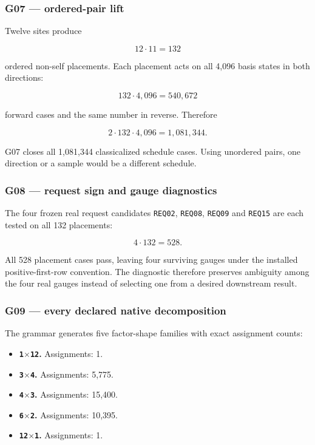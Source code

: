 \subsubsection{G07 --- ordered-pair lift}\label{viii-ch02-g07-ordered-pair-lift}

Twelve sites produce

\[
12\cdot11=132
\]

ordered non-self placements. Each placement acts on all 4,096 basis
states in both directions:

\[
132\cdot4{,}096=540{,}672
\]

forward cases and the same number in reverse. Therefore

\[
2\cdot132\cdot4{,}096=1{,}081{,}344.
\]

G07 closes all 1,081,344 classicalized schedule cases. Using unordered
pairs, one direction or a sample would be a different schedule.

\subsubsection{G08 --- request sign and gauge
diagnostics}\label{viii-ch02-g08-request-sign-and-gauge-diagnostics}

The four frozen real request candidates \texttt{REQ02}, \texttt{REQ08},
\texttt{REQ09} and \texttt{REQ15} are each tested on all 132 placements:

\[
4\cdot132=528.
\]

All 528 placement cases pass, leaving four surviving gauges under the
installed positive-first-row convention. The diagnostic therefore
preserves ambiguity among the four real gauges instead of selecting one
from a desired downstream result.

\subsubsection{G09 --- every declared native
decomposition}\label{viii-ch02-g09-every-declared-native-decomposition}

The grammar generates five factor-shape families with exact assignment
counts:

\begin{itemize}
\tightlist
\item
  \textbf{\texttt{1\ensuremath{\times}12}.} Assignments: 1.
\item
  \textbf{\texttt{3\ensuremath{\times}4}.} Assignments: 5,775.
\item
  \textbf{\texttt{4\ensuremath{\times}3}.} Assignments: 15,400.
\item
  \textbf{\texttt{6\ensuremath{\times}2}.} Assignments: 10,395.
\item
  \textbf{\texttt{12\ensuremath{\times}1}.} Assignments: 1.
\end{itemize}

